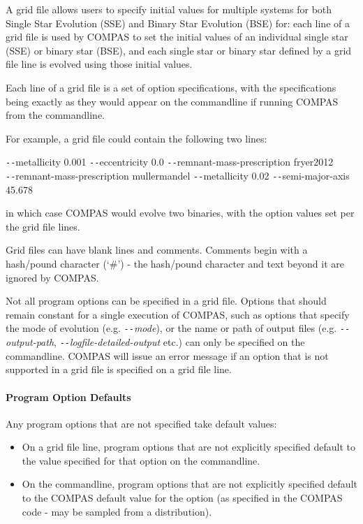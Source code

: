 A grid file allows users to specify initial values for multiple systems for both Single Star Evolution (SSE) and Binary Star Evolution (BSE) for: each line of a grid file is used by COMPAS to set the initial values of an individual single star (SSE) or binary star (BSE), and each single star or binary star defined by a grid file line is evolved using those initial values.

Each line of a grid file is a set of option specifications, with the specifications being exactly as they would appear on the commandline if running COMPAS from the commandline.

For example, a grid file could contain the following two lines:

\tabto{3em}\texttt{-{}-}metallicity 0.001 \texttt{-{}-}eccentricity 0.0 \texttt{-{}-}remnant-mass-prescription fryer2012\\
\tabto{3em}\texttt{-{}-}remnant-mass-prescription mullermandel \texttt{-{}-}metallicity 0.02 \texttt{-{}-}semi-major-axis 45.678

in which case COMPAS would evolve two binaries, with the option values set per the grid file lines.

\bigskip
Grid files can have blank lines and comments.  Comments begin with a hash/pound character (‘\#’) - the hash/pound character and text beyond it are ignored by COMPAS.

Not all program options can be specified in a grid file.  Options that should remain constant for a single execution of COMPAS, such as options that specify the mode of evolution (e.g. \texttt{-{}-}\textit{mode}), or the name or path of output files (e.g. \texttt{-{}-}\textit{output-path}, \texttt{-{}-}\textit{logfile-detailed-output} etc.) can only be specified on the commandline. COMPAS will issue an error message if an option that is not supported in a grid file is specified on a grid file line.

\paragraph{Program Option Defaults}\label{sec:ProgramOptionsdefaults}\mbox{}

Any program options that are not specified  take default values:

\begin{itemize}
\item On a grid file line, program options that are not explicitly specified default to the value specified for that option on the commandline.
\item On the commandline, program options that are not explicitly specified default to the COMPAS default value for the option (as specified in the COMPAS code - may be sampled from a distribution).
\end{itemize}

